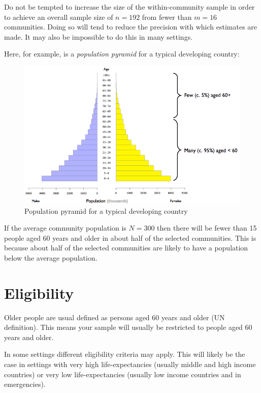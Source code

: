 \documentclass[12pt,a4paper]{book}
\theoremstyle{definition}
\theoremstyle{definition}
\theoremstyle{definition}
\theoremstyle{remark}
\begin{document}
Do not be tempted to increase the size of the within-community sample in
order to achieve an overall sample size of \(n = 192\) from fewer than
\(m = 16\) communities. Doing so will tend to reduce the precision with
which estimates are made. It may also be impossible to do this in many
settings.

Here, for example, is a \emph{population pyramid} for a typical
developing country:

\begin{figure}[H]

{\centering \includegraphics[width=11.17in]{figures/popPyramid1} 

}

\caption{Population pyramid for a typical developing country}\label{fig:sample2}
\end{figure}

If the average community population is \(N = 300\) then there will be
fewer than 15 people aged 60 years and older in about half of the
selected communities. This is because about half of the selected
communities are likely to have a population below the average
population.

\hypertarget{eligibility}{%
\section{Eligibility}\label{eligibility}}

Older people are usual defined as persons aged 60 years and older (UN
definition). This means your sample will usually be restricted to people
aged 60 years and older.

In some settings different eligibility criteria may apply. This will
likely be the case in settings with very high life-expectancies (usually
middle and high income countries) or very low life-expectancies (usually
low income countries and in emergencies).
\end{document}
